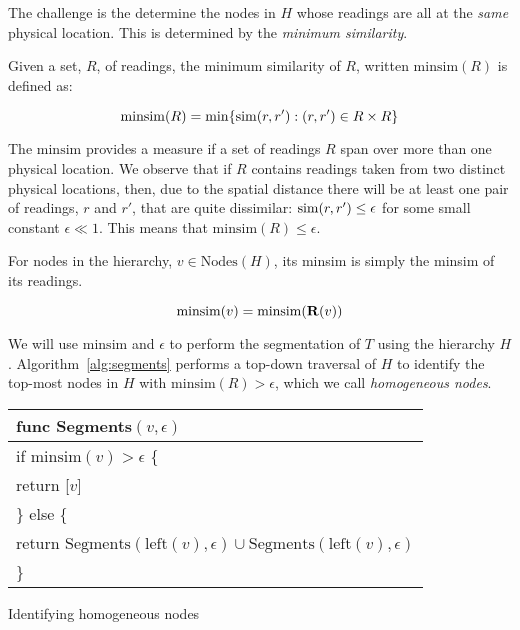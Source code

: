 The challenge is the determine the nodes in $H$ whose readings are all at the
{\em same} physical location.  This is determined by the {\em minimum
similarity}.

\begin{definition}
    Given a set, $R$, of readings, the minimum similarity of $R$, written
    $\mathrm{minsim}(R)$ is defined as:

    $$\mathrm{minsim}(R) = \min\{\mathrm{sim}(r,r'): (r,r')\in R\times R\}$$
\end{definition}

The $\mathrm{minsim}$ provides a measure if a set of readings $R$ span over more
than one physical location.
We observe that if $R$ contains readings taken from two distinct physical
locations, then, due to the spatial distance there will be at least one pair of
readings, $r$ and $r'$, that are quite dissimilar: $\mathrm{sim}(r, r') \leq \epsilon$ for some
small constant $\epsilon\ll 1$.  This means that $\mathrm{minsim}(R)\leq \epsilon$.

For nodes in the hierarchy, $v\in\mathrm{Nodes}(H)$, its minsim is simply the
minsim of its readings.

\begin{definition}
    $$\mathrm{minsim}(v) = \mathrm{minsim}(\mathbf{R}(v))$$
\end{definition}

We will use $\mathrm{minsim}$ and $\epsilon$ to perform the segmentation of $T$
using the hierarchy $H$.  Algorithm~\ref{alg:segments} performs a top-down
traversal of $H$ to identify the top-most nodes in $H$ with 
$\mathrm{minsim}(R) > \epsilon$, which we call {\em homogeneous nodes}.

\begin{algorithm}[t]
    \centering
    \begin{tabular}{|l|}\hline
        func Segments$(v, \epsilon)$ \\ \hline
        if $\mathrm{minsim}(v) > \epsilon$ \{ \\
        \RRR return [$v$] \\
        \} else \{ \\
        \RRR return $\mathrm{Segments}(\mathrm{left}(v), \epsilon) \cup
                      \mathrm{Segments}(\mathrm{left}(v), \epsilon)$ \\
        \} \\ \hline
    \end{tabular}
    \vspace{0.4cm}
    \caption{Identifying homogeneous nodes}
    \label{alg:segments}
\end{algorithm}

